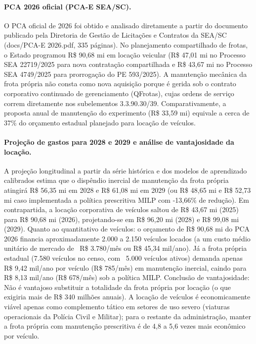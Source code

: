 \paragraph{PCA 2026 oficial (PCA-E SEA/SC).} O PCA oficial de 2026 foi obtido e analisado diretamente a partir do documento publicado pela Diretoria de Gestão de Licitações e Contratos da SEA/SC (docs/PCA-E 2026.pdf, 335 páginas). No planejamento compartilhado de frotas, o Estado programou R\$ 90,68 mi em locação veicular (R\$ 47,01 mi no Processo SEA 22719/2025 para nova contratação compartilhada e R\$ 43,67 mi no Processo SEA 4749/2025 para prorrogação do PE 593/2025). A manutenção mecânica da frota própria não consta como nova aquisição porque é gerida sob o contrato corporativo continuado de gerenciamento (QFrotas), cujas ordens de serviço correm diretamente nos subelementos 3.3.90.30/39. Comparativamente, a proposta anual de manutenção do experimento (R\$ 33,59 mi) equivale a cerca de 37\% do orçamento estadual planejado para locação de veículos.

\paragraph{Projeção de gastos para 2028 e 2029 e análise de vantajosidade da locação.} A projeção longitudinal a partir da série histórica e dos modelos de aprendizado calibrados estima que o dispêndio inercial de manutenção da frota própria atingirá R\$ 56,35 mi em 2028 e R\$ 61,08 mi em 2029 (ou R\$ 48,65 mi e R\$ 52,73 mi caso implementada a política prescritiva MILP com -13,66\% de redução). Em contrapartida, a locação corporativa de veículos saltou de R\$ 43,67 mi (2025) para R\$ 90,68 mi (2026), projetando-se em R\$ 96,20 mi (2028) e R\$ 99,08 mi (2029). Quanto ao quantitativo de veículos: o orçamento de R\$ 90,68 mi do PCA 2026 financia aproximadamente 2.000 a 2.150 veículos locados (a um custo médio unitário de mercado de ~R\$ 3.780/mês ou R\$ 45,34 mil/ano). Já a frota própria estadual (7.580 veículos no censo, com ~5.000 veículos ativos) demanda apenas R\$ 9,42 mil/ano por veículo (R\$ 785/mês) em manutenção inercial, caindo para R\$ 8,13 mil/ano (R\$ 678/mês) sob a política MILP. Conclusão de vantajosidade: Não é vantajoso substituir a totalidade da frota própria por locação (o que exigiria mais de R\$ 340 milhões anuais). A locação de veículos é economicamente viável apenas como complemento tático em setores de uso severo (viaturas operacionais da Polícia Civil e Militar); para o restante da administração, manter a frota própria com manutenção prescritiva é de 4,8 a 5,6 vezes mais econômico por veículo.

